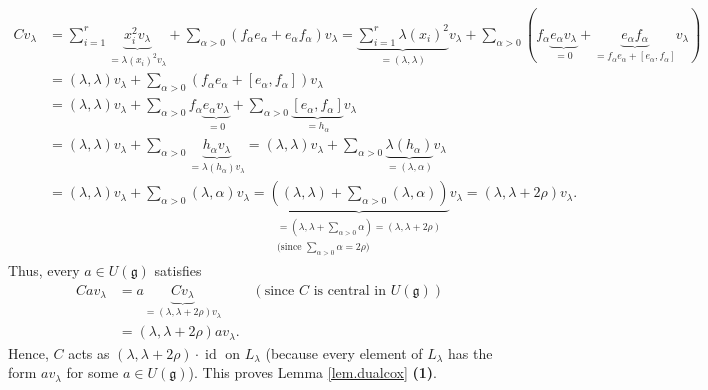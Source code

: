 \documentclass[etingof-lie.tex]{subfiles}
\begin{document}
\begin{align*}
Cv_{\lambda}  &  =\sum\limits_{i=1}^{r}\underbrace{x_{i}^{2}v_{\lambda}%
}_{=\lambda\left(  x_{i}\right)  ^{2}v_{\lambda}}+\sum\limits_{\alpha
>0}\left(  f_{\alpha}e_{\alpha}+e_{\alpha}f_{\alpha}\right)  v_{\lambda
}=\underbrace{\sum\limits_{i=1}^{r}\lambda\left(  x_{i}\right)  ^{2}%
}_{=\left(  \lambda,\lambda\right)  }v_{\lambda}+\sum\limits_{\alpha>0}\left(
f_{\alpha}\underbrace{e_{\alpha}v_{\lambda}}_{=0}+\underbrace{e_{\alpha
}f_{\alpha}}_{=f_{\alpha}e_{\alpha}+\left[  e_{\alpha},f_{\alpha}\right]
}v_{\lambda}\right) \\
&  =\left(  \lambda,\lambda\right)  v_{\lambda}+\sum\limits_{\alpha>0}\left(
f_{\alpha}e_{\alpha}+\left[  e_{\alpha},f_{\alpha}\right]  \right)
v_{\lambda}\\
&  =\left(  \lambda,\lambda\right)  v_{\lambda}+\sum\limits_{\alpha
>0}f_{\alpha}\underbrace{e_{\alpha}v_{\lambda}}_{=0}+\sum\limits_{\alpha
>0}\underbrace{\left[  e_{\alpha},f_{\alpha}\right]  }_{=h_{\alpha}}%
v_{\lambda}\\
&  =\left(  \lambda,\lambda\right)  v_{\lambda}+\sum\limits_{\alpha
>0}\underbrace{h_{\alpha}v_{\lambda}}_{=\lambda\left(  h_{\alpha}\right)
v_{\lambda}}=\left(  \lambda,\lambda\right)  v_{\lambda}+\sum\limits_{\alpha
>0}\underbrace{\lambda\left(  h_{\alpha}\right)  }_{=\left(  \lambda
,\alpha\right)  }v_{\lambda}\\
&  =\left(  \lambda,\lambda\right)  v_{\lambda}+\sum\limits_{\alpha>0}\left(
\lambda,\alpha\right)  v_{\lambda}=\underbrace{\left(  \left(  \lambda
,\lambda\right)  +\sum\limits_{\alpha>0}\left(  \lambda,\alpha\right)
\right)  }_{\substack{=\left(  \lambda,\lambda+\sum\limits_{\alpha>0}%
\alpha\right)  =\left(  \lambda,\lambda+2\rho\right)  \\\text{(since }%
\sum\limits_{\alpha>0}\alpha=2\rho\text{)}}}v_{\lambda}=\left(  \lambda
,\lambda+2\rho\right)  v_{\lambda}.
\end{align*}
Thus, every $a\in U\left(  \mathfrak{g}\right)  $ satisfies
\begin{align*}
Cav_{\lambda}  &  =a\underbrace{Cv_{\lambda}}_{=\left(  \lambda,\lambda
+2\rho\right)  v_{\lambda}}\ \ \ \ \ \ \ \ \ \ \left(  \text{since }C\text{ is
central in }U\left(  \mathfrak{g}\right)  \right) \\
&  =\left(  \lambda,\lambda+2\rho\right)  av_{\lambda}.
\end{align*}
Hence, $C$ acts as $\left(  \lambda,\lambda+2\rho\right)  \cdot
\operatorname*{id}$ on $L_{\lambda}$ (because every element of $L_{\lambda}$
has the form $av_{\lambda}$ for some $a\in U\left(  \mathfrak{g}\right)  $).
This proves Lemma \ref{lem.dualcox} \textbf{(1)}.
\end{document}
